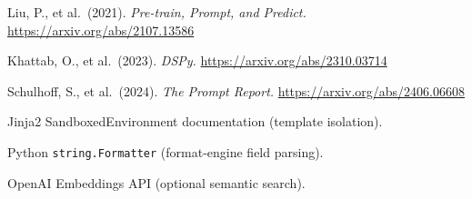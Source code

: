 \documentclass[11pt,a4paper]{article}
\newcommand{\code}[1]{\texttt{#1}}
\begin{document}
\begin{enumerate}[leftmargin=*,label={[\arabic*]}]
  \item Liu, P., et al.\ (2021).
        \emph{Pre-train, Prompt, and Predict.}
        \url{https://arxiv.org/abs/2107.13586}
  \item Khattab, O., et al.\ (2023).
        \emph{DSPy.}
        \url{https://arxiv.org/abs/2310.03714}
  \item Schulhoff, S., et al.\ (2024).
        \emph{The Prompt Report.}
        \url{https://arxiv.org/abs/2406.06608}
  \item Jinja2 SandboxedEnvironment documentation (template isolation).
  \item Python \code{string.Formatter} (format-engine field parsing).
  \item OpenAI Embeddings API (optional semantic search).
\end{enumerate}
\end{document}
